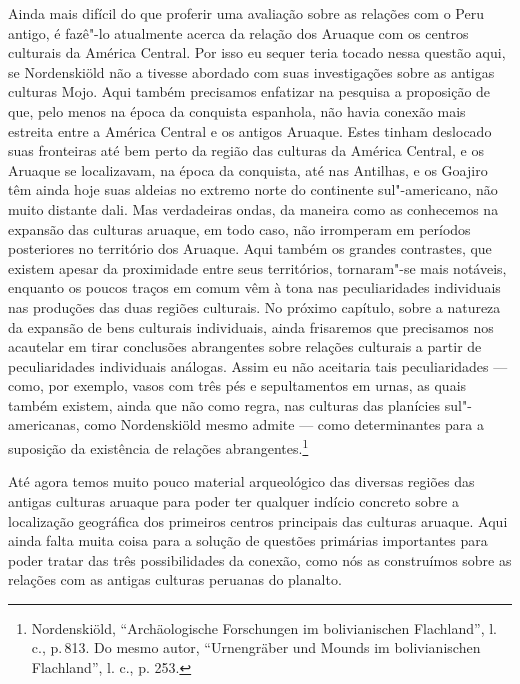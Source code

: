 Ainda mais difícil do que proferir uma avaliação sobre as relações com o
Peru antigo, é fazê"-lo atualmente acerca da relação dos Aruaque com os
centros culturais da América Central. Por isso eu sequer teria tocado
nessa questão aqui, se Nordenskiöld não a tivesse abordado com suas
investigações sobre as antigas culturas Mojo. Aqui também precisamos
enfatizar na pesquisa a proposição de que, pelo menos na época da
conquista espanhola, não havia conexão mais estreita entre a América
Central e os antigos Aruaque. Estes tinham deslocado suas fronteiras até
bem perto da região das culturas da América Central, e os Aruaque se
localizavam, na época da conquista, até nas Antilhas, e os Goajiro têm
ainda hoje suas aldeias no extremo norte do continente sul"-americano,
não muito distante dali. Mas verdadeiras ondas, da maneira como as
conhecemos na expansão das culturas aruaque, em todo caso, não
irromperam em períodos posteriores no território dos Aruaque. Aqui
também os grandes contrastes, que existem apesar da proximidade entre
seus territórios, tornaram"-se mais notáveis, enquanto os poucos traços
em comum vêm à tona nas peculiaridades individuais nas produções das
duas regiões culturais. No próximo capítulo, sobre a natureza da
expansão de bens culturais individuais, ainda frisaremos que precisamos
nos acautelar em tirar conclusões abrangentes sobre relações culturais a
partir de peculiaridades individuais análogas. Assim eu não aceitaria
tais peculiaridades --- como, por exemplo, vasos com três pés e
sepultamentos em urnas, as quais também existem, ainda que não como
regra, nas culturas das planícies sul"-americanas, como Nordenskiöld
mesmo admite --- como determinantes para a suposição da existência de
relações abrangentes.\footnote{Nordenskiöld, ``Archäologische Forschungen
  im bolivianischen Flachland'', l. c., p.\,813. Do mesmo autor,
  ``Urnengräber und Mounds im bolivianischen Flachland'', l. c., p.
  253.}

Até agora temos muito pouco material arqueológico das diversas regiões
das antigas culturas aruaque para poder ter qualquer indício concreto
sobre a localização geográfica dos primeiros centros principais das
culturas aruaque. Aqui ainda falta muita coisa para a solução de
questões primárias importantes para poder tratar das três
possibilidades da conexão, como nós as construímos sobre as relações com
as antigas culturas peruanas do planalto.

